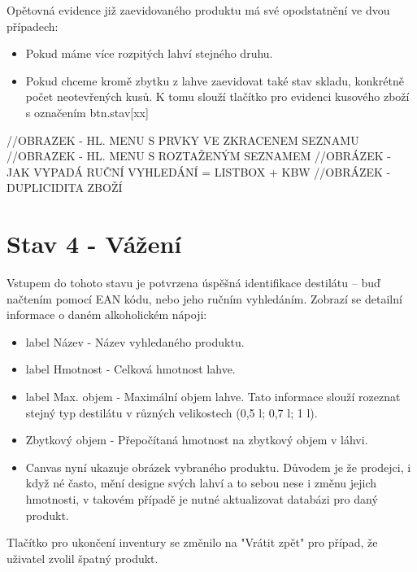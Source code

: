 Opětovná evidence již zaevidovaného produktu má své opodstatnění ve dvou případech:
\begin{itemize}
    \item Pokud máme více rozpitých lahví stejného druhu.
    \item Pokud chceme kromě zbytku z lahve zaevidovat také stav skladu, konkrétně počet neotevřených kusů. K tomu slouží tlačítko pro evidenci kusového zboží s označením btn.stav[xx]
\end{itemize}



//OBRAZEK - HL. MENU S PRVKY VE ZKRACENEM SEZNAMU
//OBRAZEK - HL. MENU S ROZTAŽENÝM SEZNAMEM
//OBRÁZEK - JAK VYPADÁ RUČNÍ VYHLEDÁNÍ = LISTBOX + KBW
//OBRÁZEK - DUPLICIDITA ZBOŽÍ

\section{Stav 4 - Vážení}
Vstupem do tohoto stavu je potvrzena úspěšná identifikace destilátu – buď načtením pomocí EAN kódu, nebo jeho ručním vyhledáním. Zobrazí se detailní informace o daném alkoholickém nápoji:
\begin{itemize}
    \item label Název - Název vyhledaného produktu.
    \item label Hmotnost - Celková hmotnost lahve.
    \item label Max. objem - Maximální objem lahve. Tato informace slouží rozeznat stejný typ destilátu v různých velikostech (0,5 l; 0,7 l; 1 l).
    \item Zbytkový objem - Přepočítaná hmotnost na zbytkový objem v láhvi.
    \item Canvas nyní ukazuje obrázek vybraného produktu. Důvodem je že prodejci, i když né často, mění designe svých lahví a to sebou nese i změnu jejich hmotnosti, v takovém případě je nutné aktualizovat databázi pro daný produkt.
\end{itemize}
\bigskip
Tlačítko pro ukončení inventury se změnilo na "Vrátit zpět" pro případ, že uživatel zvolil špatný produkt.

